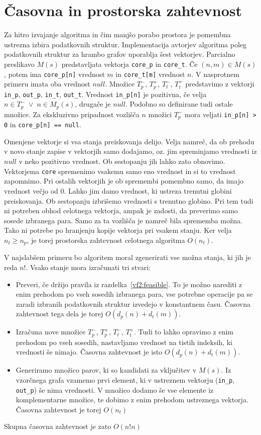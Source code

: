 \documentclass[a4paper, 12pt, ]{book}
\newcommand{\code}[1]{\mbox{\texttt{#1}}}
\begin{document}
	\section{Časovna in prostorska zahtevnost}
	\label{vf2:impl}
	Za hitro izvajanje algoritma in čim manjšo porabo prostora je pomembna ustrezna izbira podatkovnih struktur. Implementacija avtorjev algoritma	
	poleg podatkovnih struktur za hrambo grafov
	uporablja šest vektorjev. Parcialno preslikavo $M(s)$ predstavljata vektorja \code{core\_p} in \code{core\_t}. Če $(n,m) \in M(s)$, potem
	ima \code{core\_p[n]} vrednost $m$ in \code{core\_t[m]} vrednost $n$. V nasprotnem primeru imata oba vrednost $null$. Množice $T_p^-$, 
	$T_p^+$, $T_t^-$, $T_t^+$ predstavimo z vektorji \code{in\_p}, \code{out\_p}, \code{in\_t}, \code{out\_t}. Vrednost \code{in\_p[n]} je 
	pozitivna, če velja $n \in T_p^- \; \vee \; n \in M_p(s)$, drugače je $null$. Podobno so definirane tudi ostale množice. Za ekskluzivno pripadnost
	vozlišča $n$ množici $T_p^-$ mora veljati \code{in\_p[n] > 0} in \code{core\_p[n] == null}.
	
	Omenjene vektorje si vsa stanja preiskovanja delijo. Velja namreč, da ob prehodu v novo stanje zapise v vektorjih samo dodajamo, oz. jim spreminjamo
	vrednosti iz $null$ v neko pozitivno vrednost. Ob sestopanju jih lahko zato obnovimo. Vektorjema \code{core} spremenimo vsakemu samo eno vrednost 
	in si to vrednost zapomnimo. Pri ostalih vektorjih je ob spremembi pomembno samo, da imajo vrednost večjo od 0. Lahko jim damo vrednost, ki ustreza
	trenutni globini preiskovanja. Ob sestopanju izbrišemo vrednosti s trenutno globino. Pri tem tudi ni potreben obhod celotnega vektorja,
	ampak je zadosti, da preverimo samo sosede izbranega para. Samo za ta vozlišča je namreč bila sprememba možna.
	Tako ni potrebe po hranjenju kopije vektorja pri vsakem stanju. Ker velja $n_t \geq n_p$, je torej prostorska zahtevnost celotnega algoritma $O(n_t)$.
	
	V najslabšem primeru bo algoritem moral zgenerirati vse možna stanja, ki jih je reda $n!$. Vsako stanje mora izračunati tri stvari:
	\begin{itemize}
	\item Preveri, če držijo pravila iz razdelka~\ref{vf2:feasible}. To je možno narediti z enim prehodom po vseh sosedih izbranega para, vse
	potrebne operacije pa se zaradi izbranih podatkovnih struktur izvedejo v konstantnem času. Časovna zahtevnost tega dela je torej $O(d_p(n) + d_t(m))$.
	\item Izračuna nove množice $T_p^-$, $T_p^+$, $T_t^-$, $T_t^+$. Tudi to lahko opravimo z enim prehodom po vseh sosedih, nastavljamo vrednost
	na tistih indeksih, ki vrednosti še nimajo. Časovna zahtevnost je isto $O(d_p(n) + d_t(m))$.
	\item Generiramo množico parov, ki so kandidati za vključitev v $M(s)$. Iz vzorčnega grafa vzamemo prvi element, ki v ustreznem vektorju (\code{in\_p},
	\code{out\_p}) še nima vrednosti. V množico dodamo še vse elemente iz komplementarne množice, te dobimo z enim prehodom ustreznega vektorja.
	Časovna zahtevnost je torej $O(n_t)$
	\end{itemize}
	Skupna časovna zahtevnost je zato $O(n!n)$
\end{document}
